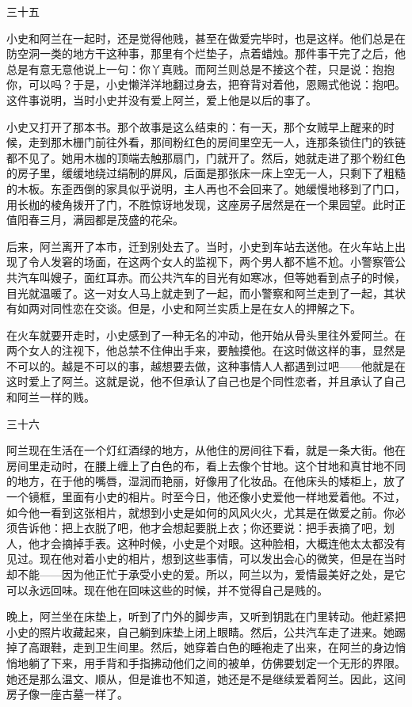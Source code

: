 三十五 

小史和阿兰在一起时，还是觉得他贱，甚至在做爱完毕时，也是这样。他们总是在防空洞一类的地方干这种事，那里有个烂垫子，点着蜡烛。那件事干完了之后，他总是有意无意他说上一句：你丫真贱。而阿兰则总是不接这个茬，只是说：抱抱你，可以吗？于是，小史懒洋洋地翻过身去，把脊背对着他，恩赐式他说：抱吧。这件事说明，当时小史并没有爱上阿兰，爱上他是以后的事了。 

小史又打开了那本书。那个故事是这么结束的：有一天，那个女贼早上醒来的时候，走到那木栅门前往外看，那间粉红色的房间里空无一人，连那条锁住门的铁链都不见了。她用木枷的顶端去触那扇门，门就开了。然后，她就走进了那个粉红色的房子里，缓缓地绕过绢制的屏风，后面是那张床一床上空无一人，只剩下了粗糙的木板。东歪西倒的家具似乎说明，主人再也不会回来了。她缓慢地移到了门口，用长枷的棱角拨开了门，不胜惊讶地发现，这座房子居然是在一个果园望。此时正值阳春三月，满园都是茂盛的花朵。 

后来，阿兰离开了本市，迁到别处去了。当时，小史到车站去送他。在火车站上出现了令人发窘的场面，在这两个女人的监视下，两个男人都不尴不尬。小警察管公共汽车叫嫂子，面红耳赤。而公共汽车的目光有如寒冰，但等她看到点子的时候，目光就温暖了。这一对女人马上就走到了一起，而小警察和阿兰走到了一起，其状有如两对同性恋在交谈。但是，小史和阿兰实质上是在女人的押解之下。 

在火车就要开走时，小史感到了一种无名的冲动，他开始从骨头里往外爱阿兰。在两个女人的注视下，他总禁不住伸出手来，要触摸他。在这时做这样的事，显然是不可以的。越是不可以的事，越想要去做，这种事情人人都遇到过吧——他就是在这时爱上了阿兰。这就是说，他不但承认了自己也是个同性恋者，并且承认了自己和阿兰一样的贱。 

三十六 

阿兰现在生活在一个灯红酒绿的地方，从他住的房间往下看，就是一条大街。他在房间里走动时，在腰上缠上了白色的布，看上去像个甘地。这个甘地和真甘地不同的地方，在于他的嘴唇，湿润而艳丽，好像用了化妆品。在他床头的矮柜上，放了一个镜框，里面有小史的相片。时至今日，他还像小史爱他一样地爱着他。不过，如今他一看到这张相片，就想到小史是如何的风风火火，尤其是在做爱之前。你必须告诉他：把上衣脱了吧，他才会想起要脱上衣；你还要说：把手表摘了吧，划人，他才会摘掉手表。这种时候，小史是个对眼。这种脸相，大概连他太太都没有见过。现在他对着小史的相片，想到这些事情，可以发出会心的微笑，但是在当时却不能——因为他正忙于承受小史的爱。所以，阿兰以为，爱情最美好之处，是它可以永远回味。现在他在回味这些的时候，并不觉得自己是贱的。 

晚上，阿兰坐在床垫上，听到了门外的脚步声，又听到钥匙在门里转动。他赶紧把小史的照片收藏起来，自己躺到床垫上闭上眼睛。然后，公共汽车走了进来。她踢掉了高跟鞋，走到卫生间里。然后，她穿着白色的睡袍走了出来，在阿兰的身边悄悄地躺了下来，用手背和手指拂动他们之间的被单，仿佛要划定一个无形的界限。她还是那么温文、顺从，但是谁也不知道，她还是不是继续爱着阿兰。因此，这间房子像一座古墓一样了。 

